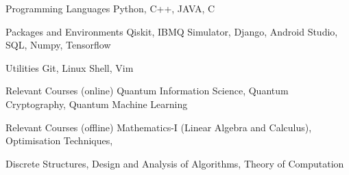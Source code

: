 

\begin{cvskills}

  \cvskill
    {Programming Languages} %
    {Python, C++, JAVA, C} %

  \cvskill
    {Packages and Environments} %
    {Qiskit, IBMQ Simulator, Django, Android Studio, SQL, Numpy, Tensorflow} %
    

  \cvskill
    {Utilities} %
    {Git, Linux Shell, Vim} %


  \cvskill
    {Relevant Courses (online)} %
    {Quantum Information Science, Quantum Cryptography, Quantum Machine Learning} %

    
  \cvskill
    {Relevant Courses (offline)}
    {Mathematics-I (Linear Algebra and Calculus), Optimisation Techniques,} 
    
  \cvskill
  {}
  {Discrete Structures, Design and Analysis of Algorithms, Theory of Computation}
\end{cvskills}
